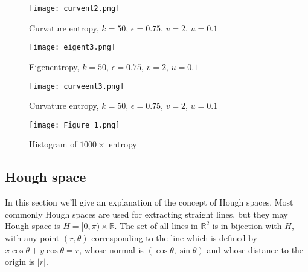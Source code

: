 \documentclass[a4paper,11pt,twoside]{article}
\theoremstyle{definition}
\theoremstyle{remark}
\begin{document}
\begin{figure}[!h]
  \caption{Curvature entropy, $k = 50$, $\epsilon = 0.75$, $v = 2$, $u=0.1$}
  \centering
    \texttt{[image: curvent2.png]}
    \label{curvent2}
\end{figure}
\newpage
\begin{figure}[!h]
  \caption{Eigenentropy, $k = 50$, $\epsilon = 0.75$, $v = 2$, $u=0.1$}
  \centering
    \texttt{[image: eigent3.png]}
    \label{eigent3}
\end{figure}

\begin{figure}[!h]
  \caption{Curvature entropy, $k = 50$, $\epsilon = 0.75$, $v = 2$, $u=0.1$}
  \centering
    \texttt{[image: curveent3.png]}
    \label{curvent3}
\end{figure}
\newpage
\begin{figure}[!h]
  \caption{Histogram of $1000\times$ entropy}
  \centering
    \texttt{[image: Figure\_1.png]}
    \label{enthist}
\end{figure}
\newpage 
\subsection{Hough space}\label{hough}
In this section we'll give an explanation of the concept of Hough spaces. Most commonly Hough spaces are used for extracting straight lines, but they may
Hough space is $H = [0,\pi)\times \mathbb{R}$. The set of all lines in $\mathbb{R}^2$ is in bijection with $H$, with any point $(r,\theta)$ corresponding to the line which is defined by $x\cos\theta +y\cos\theta=r$, whose normal is $(\cos\theta,\sin\theta)$ and whose distance to the origin is $|r|$.
\end{document}
